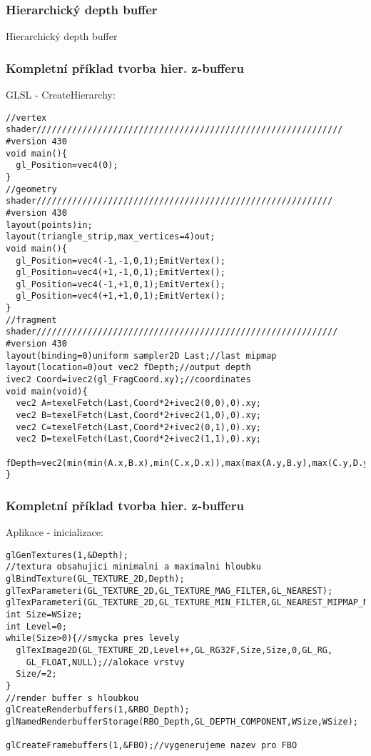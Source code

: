 \begin{frame}
\frametitle{Hierarchický depth buffer}
\begin{center}
\Huge {\color{white}Hierarchický depth buffer}
\end{center}
\end{frame}

\begin{frame}[fragile]
\frametitle{Kompletní příklad tvorba hier. z-bufferu}
		GLSL - CreateHierarchy:
		{\tiny
		\begin{verbatim}
//vertex shader////////////////////////////////////////////////////////////
#version 430
void main(){
  gl_Position=vec4(0);
}
//geometry shader//////////////////////////////////////////////////////////
#version 430
layout(points)in;
layout(triangle_strip,max_vertices=4)out;
void main(){
  gl_Position=vec4(-1,-1,0,1);EmitVertex();
  gl_Position=vec4(+1,-1,0,1);EmitVertex();
  gl_Position=vec4(-1,+1,0,1);EmitVertex();
  gl_Position=vec4(+1,+1,0,1);EmitVertex();
}
//fragment shader///////////////////////////////////////////////////////////
#version 430
layout(binding=0)uniform sampler2D Last;//last mipmap
layout(location=0)out vec2 fDepth;//output depth
ivec2 Coord=ivec2(gl_FragCoord.xy);//coordinates
void main(void){
  vec2 A=texelFetch(Last,Coord*2+ivec2(0,0),0).xy;
  vec2 B=texelFetch(Last,Coord*2+ivec2(1,0),0).xy;
  vec2 C=texelFetch(Last,Coord*2+ivec2(0,1),0).xy;
  vec2 D=texelFetch(Last,Coord*2+ivec2(1,1),0).xy;
  fDepth=vec2(min(min(A.x,B.x),min(C.x,D.x)),max(max(A.y,B.y),max(C.y,D.y)));
}
		\end{verbatim}
		}
\end{frame}

\begin{frame}[fragile]
\frametitle{Kompletní příklad tvorba hier. z-bufferu}
		Aplikace - inicializace:
		{\scriptsize
		\begin{verbatim}
glGenTextures(1,&Depth);
//textura obsahujici minimalni a maximalni hloubku
glBindTexture(GL_TEXTURE_2D,Depth);
glTexParameteri(GL_TEXTURE_2D,GL_TEXTURE_MAG_FILTER,GL_NEAREST);
glTexParameteri(GL_TEXTURE_2D,GL_TEXTURE_MIN_FILTER,GL_NEAREST_MIPMAP_NEAREST);
int Size=WSize;
int Level=0;
while(Size>0){//smycka pres levely
  glTexImage2D(GL_TEXTURE_2D,Level++,GL_RG32F,Size,Size,0,GL_RG,
    GL_FLOAT,NULL);//alokace vrstvy
  Size/=2;
}
//render buffer s hloubkou
glCreateRenderbuffers(1,&RBO_Depth);
glNamedRenderbufferStorage(RBO_Depth,GL_DEPTH_COMPONENT,WSize,WSize);

glCreateFramebuffers(1,&FBO);//vygenerujeme nazev pro FBO
		\end{verbatim}
		}
\end{frame}


